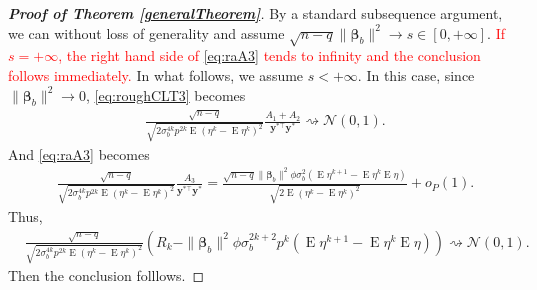 \documentclass[11pt]{article}
\newcommand\CG[1]{\textcolor{red}{#1}}
\DeclareMathOperator{\myE}{E}
\newcommand{\By}{\mathbf{y}}    \newcommand{\Bz}{\mathbf{z}}
\newcommand{\bfsym}[1]{\ensuremath{\boldsymbol{#1}}}
\def\bbeta{\bfsym \beta}
\theoremstyle{plain}
\theoremstyle{definition}
\theoremstyle{remark}
\begin{document}
\begin{appendices}
\begin{proof}[\textbf{Proof of Theorem \ref{generalTheorem}}]
By a standard subsequence argument, we can without loss of generality and assume
$\sqrt{n-q} \|\bbeta_b\|^2 \to s \in [0,+\infty]$.
\CG{If $s=+\infty$, the right hand side of \eqref{eq:raA3} tends to infinity and the conclusion follows immediately.}
In what follows, we assume $s<+\infty$.
In this case, since $\|\bbeta_b\|^2\to 0$, \eqref{eq:roughCLT3} becomes
    \begin{equation*}
        \begin{split}
    &
    \frac{
        \sqrt{n-q}
    }{\sqrt{
            2
            \sigma_b^{4k} p^{2k}
         \myE (\eta^k - \myE \eta^k)^2
    }}
    \frac{
        A_1+A_2
    }{\By^{*\top} \By^*}
    \rightsquigarrow \mathcal N(0,1).
        \end{split}
    \end{equation*}
    And \eqref{eq:raA3} becomes
\begin{equation*}
    \begin{split}
    &\frac{
        \sqrt{n-q}
    }{\sqrt{
            2
            \sigma_b^{4k} p^{2k}
            \myE (\eta^k - \myE \eta^k)^2
    }}
    \frac{
        A_3
    }{\By^{*\top} \By^*}
    =
    \frac{
         \sqrt{n-q} \|\bbeta_b\|^2 \phi \sigma_b^{2}  \left(\myE \eta^{k+1} - \myE \eta^k \myE \eta\right)
    }{\sqrt{
                2 \myE (\eta^k - \myE \eta^k)^2
        }}
        +o_P(1)
        .
    \end{split}
\end{equation*}
Thus,
\begin{equation*}
    \begin{split}
    &
    \frac{
        \sqrt{n-q}
    }{\sqrt{
            2
            \sigma_b^{4k} p^{2k}
            \myE (\eta^k - \myE \eta^k)^2
    }}
    \left( 
        R_k
    -
          \|\bbeta_b\|^2 \phi \sigma_b^{2k+2} p^k  \left(\myE \eta^{k+1} - \myE \eta^k \myE \eta\right)
    \right)
        \rightsquigarrow \mathcal N (0,1).
    \end{split}
\end{equation*}
Then the conclusion folllows.

\end{proof}


\end{appendices}
\end{document}
